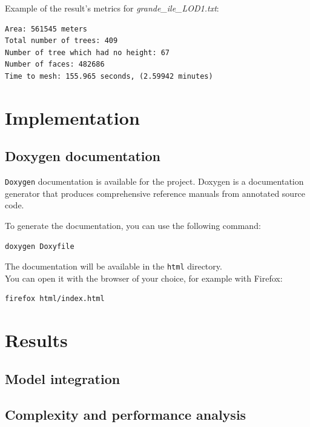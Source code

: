 \documentclass[12pt]{article}
\begin{document}
Example of the result's metrics for \textit{grande\_ile\_LOD1.txt}:

\begin{lstlisting}
Area: 561545 meters
Total number of trees: 409
Number of tree which had no height: 67
Number of faces: 482686
Time to mesh: 155.965 seconds, (2.59942 minutes)
\end{lstlisting}

\newpage

\section{Implementation}
\subsection{Doxygen documentation}

\texttt{Doxygen}\cite{doxygen} documentation is available for the project. Doxygen is a
documentation generator that produces comprehensive reference manuals from
annotated source code.

To generate the documentation, you can use the following command:

\begin{lstlisting}[language=bash]
doxygen Doxyfile
\end{lstlisting}

The documentation will be available in the \texttt{html} directory.\\
You can open it with the browser of your choice, for example with Firefox:

\begin{lstlisting}[language=bash]
firefox html/index.html
\end{lstlisting}

\newpage

\section{Results}
\label{sec:Results}
\subsection{Model integration}


\subsection{Complexity and performance analysis}
\end{document}
